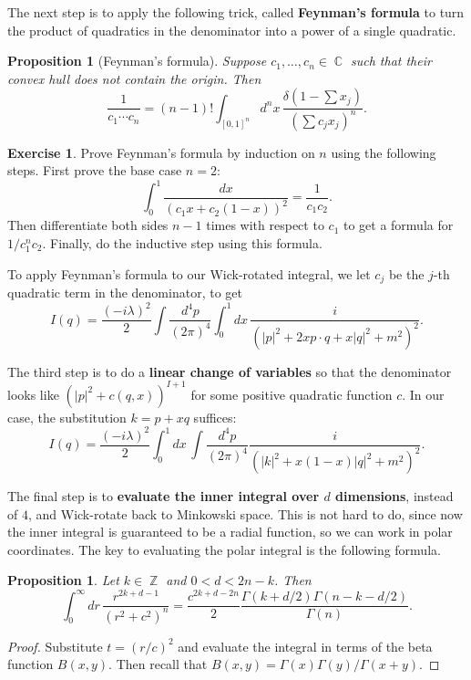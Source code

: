 \documentclass{report}
\theoremstyle{plain}
\newtheorem{proposition}[theorem]{Proposition}
\theoremstyle{definition}
\newtheorem{exercise}{Exercise}[section]
\theoremstyle{remark}
\DeclareMathOperator{\bC}{\mathbb{C}}
\DeclareMathOperator{\bZ}{\mathbb{Z}}
\begin{document}
The next step is to apply the following trick, called {\bf Feynman's
  formula} to turn the product of quadratics in the denominator into a
power of a single quadratic.

\begin{proposition}[Feynman's formula]
  Suppose $c_1, \ldots, c_n \in \bC$ such that their convex hull does
  not contain the origin. Then
  $$ \frac{1}{c_1 \cdots c_n} = (n-1)! \int_{[0,1]^n} d^nx \, \frac{\delta(1 - \sum x_j)}{\left(\sum c_j x_j\right)^n}. $$
\end{proposition}

\begin{exercise}
  Prove Feynman's formula by induction on $n$ using the following
  steps. First prove the base case $n = 2$:
  $$ \int_0^1 \frac{dx}{(c_1x + c_2(1 - x))^2} = \frac{1}{c_1c_2}. $$
  Then differentiate both sides $n-1$ times with respect to $c_1$ to
  get a formula for $1/c_1^nc_2$. Finally, do the inductive step using
  this formula.
\end{exercise}

To apply Feynman's formula to our Wick-rotated integral, we let $c_j$
be the $j$-th quadratic term in the denominator, to get
$$ I(q) = \frac{(-i\lambda)^2}{2} \int \frac{d^4p}{(2\pi)^4} \int_0^1 dx \, \frac{i}{(|p|^2 + 2x p \cdot q + x|q|^2 + m^2)^2}. $$

The third step is to do a {\bf linear change of variables} so that the
denominator looks like $(|p|^2 + c(q, x))^{I+1}$ for some positive
quadratic function $c$. In our case, the substitution $k = p + xq$
suffices:
$$ I(q) = \frac{(-i\lambda)^2}{2} \int_0^1 dx \, \int \frac{d^4p}{(2\pi)^4} \frac{i}{(|k|^2 + x(1 - x)|q|^2 + m^2)^2}. $$

The final step is to {\bf evaluate the inner integral over $d$
  dimensions}, instead of $4$, and Wick-rotate back to Minkowski
space. This is not hard to do, since now the inner integral is
guaranteed to be a radial function, so we can work in polar
coordinates. The key to evaluating the polar integral is the following
formula.

\begin{proposition}
  Let $k \in \bZ$ and $0 < d < 2n-k$. Then
  $$ \int_0^\infty dr \,  \frac{r^{2k+d-1}}{(r^2 + c^2)^n} = \frac{c^{2k+d-2n}}{2} \frac{\Gamma(k+d/2) \Gamma(n-k-d/2)}{\Gamma(n)}. $$
\end{proposition}

\begin{proof}
  Substitute $t = (r/c)^2$ and evaluate the integral in terms of the
  beta function $B(x, y)$. Then recall that
  $B(x, y) = \Gamma(x)\Gamma(y)/\Gamma(x+y)$.
\end{proof}
\end{document}
